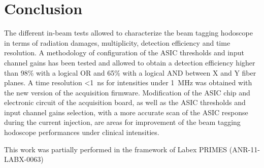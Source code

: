 \documentclass[a4paper,11pt]{article}
\begin{document}
\section{Conclusion}

The different in-beam tests allowed to characterize the beam tagging hodoscope in terms of radiation damages, multiplicity, detection efficiency and time resolution. A methodology of configuration of the ASIC thresholds and input channel gains has been tested and allowed to obtain a detection efficiency higher than 98\% with a logical OR and 65\% with a logical AND between X and Y fiber planes. A time resolution <1~ns for intensities under 1~MHz was obtained with the new version of the acquisition firmware.
Modification of the ASIC chip and electronic circuit of the acquisition board, as well as the ASIC thresholds and input channel gains selection, with a more accurate scan of the ASIC response during the current injection, are areas for improvement of the beam tagging hodoscope performances under clinical intensities.






\acknowledgments
This work was partially performed in the framework of Labex PRIMES (ANR-11-LABX-0063) 
















\end{document}
